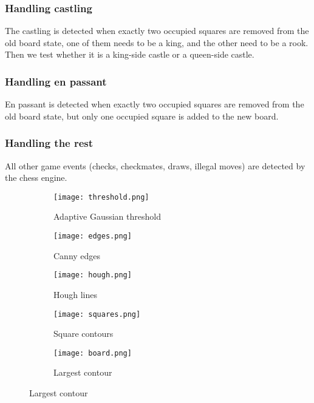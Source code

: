 \documentclass{article}
\begin{document}
\subsubsection{Handling castling}
The castling is detected when exactly two occupied squares are removed from the old board state, one of them needs to be a king, and the other need to be a rook. Then we test whether it is a king-side castle or a queen-side castle.

\subsubsection{Handling en passant}
En passant is detected when exactly two occupied squares are removed from the old board state, but only one occupied square is added to the new board.

\subsubsection{Handling the rest}
All other game events (checks, checkmates, draws, illegal moves) are detected by the chess engine.

\newpage
\begin{figure}[!htbp]
    \centering
    \begin{subfigure}{0.45\textwidth}
        \centering
        \texttt{[image: threshold.png]}
        \caption{Adaptive Gaussian threshold}
        \label{fig:th}
    \end{subfigure}
    \hfill
    \begin{subfigure}{0.45\textwidth}
        \centering
        \texttt{[image: edges.png]}
        \caption{Canny edges}
        \label{fig:ed}
    \end{subfigure}

    \centering
    \begin{subfigure}{0.45\textwidth}
        \centering
        \texttt{[image: hough.png]}
        \caption{Hough lines}
        \label{fig:hou}
    \end{subfigure}
    \hfill
    \begin{subfigure}{0.45\textwidth}
        \centering
        \texttt{[image: squares.png]}
        \caption{Square contours}
        \label{fig:sq}
    \end{subfigure}

    \begin{subfigure}{0.45\textwidth}
        \centering
        \texttt{[image: board.png]}
        \caption{Largest contour}
        \label{fig:bo}
    \end{subfigure}

\end{figure}
\end{document}
